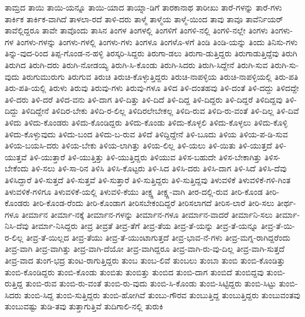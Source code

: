 {ತಾಮ್ರದ
ತಾಯಿ
ತಾಯಿ-ಯನ್ನೂ
ತಾಯಿ-ಯಾದ
ತಾಯ್ನಾ-ಡಿಗೆ
ತಾರಕಾನಾಥ
ತಾರೀಖು
ತಾರೆ-ಗಳನ್ನು
ತಾರೆ-ಗಳು
ತಾರ್ಕಿಕ
ತಾರ್ಕಿಕ-ವಾಗಿದೆ
ತಾಳಲಾ-ರದೆ
ತಾಳಿ-ದರು
ತಾಳ್ಮೆ
ತಾಳ್ಮೆಯ
ತಾಳ್ಮೆ-ಯಿಂದ
ತಾವು
ತಾವೂ
ತಾವೆರ್ನಿಯರ್
ತಾವೆಲ್ಲಿದ್ದರೂ
ತಾವೇ
ತಾವೊಂದು
ತಾಸಿನ
ತಿಂಗಳ
ತಿಂಗಳಲ್ಲಿ
ತಿಂಗಳಿಗೆ
ತಿಂಗಳಿ-ನಲ್ಲಿ
ತಿಂಗಳಿ-ನಲ್ಲೇ
ತಿಂಗಳು
ತಿಂಗಳು-ಗಳ
ತಿಂಗಳು-ಗಳನ್ನು
ತಿಂಗಳು-ಗಳಲ್ಲಿ
ತಿಂಗಳು-ಗಳು
ತಿಂಗಳೂ
ತಿಂಗಳೊ-ಳಗೆ
ತಿಂಡಿ
ತಿಂಡಿ-ಯನ್ನು
ತಿಂದು
ತಿನಿಸು-ಗಳು
ತಿನ್ನು-ವುದ-ರಿಂದ
ತಿಪ್ಪ-ಗೊಂಡ-ನ-ಹಳ್ಳಿ
ತಿರಸ್ಕರಿ-ಸಿದ್ದರು
ತಿರುಗಾ-ಡಲು
ತಿರುಗಾ-ಡುತ್ತಿದ್ದರು
ತಿರುಗಾಡುತ್ತಿದ್ದೆವು
ತಿರುಗಿ
ತಿರುಗಿದ
ತಿರುಗಿ-ದರು
ತಿರುಗಿ-ನೋಡಯ್ಯ
ತಿರುಗಿ-ಸಿ-ಕೊಂಡು
ತಿರುಗಿ-ಸಿದರು
ತಿರುಗಿ-ಸಿದ್ದೇನೆ
ತಿರುಗಿ-ಸುವ
ತಿರುಗಿ-ಸು-ವುದು
ತಿರುಗುಮುರುಗು
ತಿರುಗುವ
ತಿರುಚಿ
ತಿರುಚಿ-ಕೊಳ್ಳುತ್ತಿದ್ದರು
ತಿರುಚಿ-ನಾಪಳ್ಳಿಯ
ತಿರುಚಿ-ನಾಪಳ್ಳಿಯಲ್ಲಿ
ತಿರು-ಪತಿ
ತಿರು-ಪತಿ-ಯಲ್ಲಿ
ತಿರುಳು
ತಿರುವು
ತಿರುವು-ಗಳು
ತಿರುವು-ಗಳೂ
ತಿಳಿದ
ತಿಳಿ-ದಂತಹವು
ತಿಳಿ-ದಂತೆ
ತಿಳಿ-ದದ್ದು
ತಿಳಿದದ್ದೇ
ತಿಳಿ-ದರು
ತಿಳಿ-ದರೆ
ತಿಳಿದ-ವನು
ತಿಳಿ-ದಾಗ
ತಿಳಿ-ದಿತ್ತು
ತಿಳಿ-ದಿದೆ
ತಿಳಿ-ದಿದ್ದ
ತಿಳಿ-ದಿದ್ದರು
ತಿಳಿ-ದಿದ್ದರೆ
ತಿಳಿದಿದ್ದವು
ತಿಳಿ-ದಿದ್ದು
ತಿಳಿದಿದ್ದೇನೆ
ತಿಳಿದಿರ-ಬೇಕು
ತಿಳಿದಿ-ರ-ಲಿಲ್ಲ
ತಿಳಿದಿರಲೇಬೇಕಲ್ಲ
ತಿಳಿದಿ-ರುವ
ತಿಳಿದಿ-ರು-ವಂತೆ
ತಿಳಿ-ದಿಲ್ಲ
ತಿಳಿ-ದಿವೆ
ತಿಳಿದು
ತಿಳಿದು-ಕೊಂಡರು
ತಿಳಿದು-ಕೊಂಡಿದ್ದರು
ತಿಳಿದು-ಕೊಂಡು
ತಿಳಿದು-ಕೊಳ್ಳಲಿ
ತಿಳಿದು-ಕೊಳ್ಳಲು
ತಿಳಿದು-ಕೊಳ್ಳಿ
ತಿಳಿದು-ಕೊಳ್ಳುವುದು
ತಿಳಿದು-ಬಂದ
ತಿಳಿದು-ಬ-ರುವ
ತಿಳಿದೆ
ತಿಳಿದ್ದಿದ್ದೇನೆ
ತಿಳಿ-ಬೂದು
ತಿಳಿಯ
ತಿಳಿಯ-ಪ-ಡಿ-ಸುವ
ತಿಳಿಯ-ಬಯಸಿ-ದರು
ತಿಳಿಯ-ಬೇಕು
ತಿಳಿಯ-ಲಾಗಿತ್ತು
ತಿಳಿಯ-ಲಿಲ್ಲ
ತಿಳಿ-ಯಲು
ತಿಳಿ-ಯಿತು
ತಿಳಿ-ಯುತ್ತದೆ
ತಿಳಿ-ಯುತ್ತವೆ
ತಿಳಿ-ಯುತ್ತಾರೆ
ತಿಳಿ-ಯುತ್ತಿತ್ತು
ತಿಳಿ-ಯುತ್ತಿದ್ದರು
ತಿಳಿಯುವ
ತಿಳಿಸ-ಬಹುದೇ
ತಿಳಿಸ-ಬೇಕಾಗಿತ್ತು
ತಿಳಿಸ-ಬೇಕೆಂದು
ತಿಳಿ-ಸಲು
ತಿಳಿ-ಸಾ-ರಿನ
ತಿಳಿಸಿ
ತಿಳಿಸಿ-ಕೊಟ್ಟರು
ತಿಳಿ-ಸಿದ
ತಿಳಿಸಿ-ದರು
ತಿಳಿಸಿ-ದಾಗ
ತಿಳಿ-ಸಿದೆ
ತಿಳಿಸಿ-ದೆವು
ತಿಳಿಸಿದ್ದಾರೆ
ತಿಳಿ-ಸುತ್ತದೆ
ತಿಳಿ-ಸುತ್ತವೆ
ತಿಳಿ-ಸುತ್ತಾರೆ
ತಿಳಿ-ಸುತ್ತಿದ್ದರು
ತಿಳಿ-ಸುತ್ತಿದ್ದವು
ತಿಳುವಳಿಕೆ
ತಿಳುವಳಿಕೆ-ಗಳಿ-ಗಿಂತ
ತಿಳುವಳಿಕೆ-ಗಳಿಗೂ
ತಿಳುವಳಿಕೆ-ಯಲ್ಲಿ
ತಿಳುವಳಿ-ಕೆಯು
ತೀಕ್ಷ್ಣ
ತೀಕ್ಷ್ಣ-ವಾಗಿ
ತೀರ-ದಲ್ಲಿ-ರುವ
ತೀರಿ-ಕೊಂಡ
ತೀರಿ-ಕೊಂಡರು
ತೀರಿ-ಕೊಂಡ-ರೆಂದು
ತೀರಿ-ಕೊಂಡಾಗ
ತೀರಿಸಬೇಕಂದಿದ್ದರೆ
ತೀರಿಸಲಾಗದೆ
ತೀರಿಸ-ಲಾರೆ
ತೀರಿ-ಸಲು
ತೀರ್ಥ-ಗಳೂ
ತೀರ್ಮಾನ
ತೀರ್ಮಾ-ನಕ್ಕೆ
ತೀರ್ಮಾನ-ಗಳನ್ನು
ತೀರ್ಮಾನ-ಗಳೂ
ತೀರ್ಮಾನ-ವಾದರೆ
ತೀರ್ಮಾನಿ-ಸಲು
ತೀರ್ಮಾ-ನಿಸಿ-ದೆವು
ತೀರ್ಮಾ-ನಿಸಿದ್ದರು
ತೀವ್ರ
ತೀವ್ರತೆ
ತೀವ್ರ-ತೆಗೆ
ತೀವ್ರ-ತೆಯ
ತೀವ್ರ-ತೆ-ಯನ್ನು
ತೀವ್ರ-ತೆ-ಯನ್ನೂ
ತೀವ್ರ-ತೆ-ಯಿ-ರ-ಲಿಲ್ಲ
ತೀವ್ರ-ತೆ-ಯಿಲ್ಲದ
ತೀವ್ರ-ತೆಯು
ತೀವ್ರ-ತೆ-ಯುಂಟಾಗುತ್ತದೆ
ತೀವ್ರ-ಭಾವ-ನೆ-ಗಳು
ತೀವ್ರ-ಮಗ್ನ-ರಾಗಿದ್ದರೆಂದು
ತೀವ್ರ-ವಾಗಿ
ತೀವ್ರ-ವಾಗಿತ್ತು
ತೀವ್ರ-ವಾಗಿ-ದೆಯೋ
ತೀವ್ರ-ವಾಗಿದ್ದರೂ
ತೀವ್ರ-ವಾಗಿ-ರು-ವು-ದಿಲ್ಲ
ತೀವ್ರ-ವಾಗಿ-ಸುತ್ತದೆ
ತೀವ್ರ-ವಾದ
ತುಂಗ-ಭದ್ರ
ತುಂಟ-ರಾಗುತ್ತಿದ್ದರು
ತುಂಬ
ತುಂಬ-ಲಿವೆ
ತುಂಬಲು
ತುಂಬಾ
ತುಂಬಿ
ತುಂಬಿ-ಕೊಂಡಿತ್ತು
ತುಂಬಿ-ಕೊಂಡಿದ್ದರು
ತುಂಬಿ-ಕೊಂಡು
ತುಂಬಿತು
ತುಂಬಿತ್ತು
ತುಂಬಿದ
ತುಂಬಿ-ದಾಗ
ತುಂಬಿದೆ
ತುಂಬಿದ್ದವು
ತುಂಬಿ-ರುತ್ತಿದ್ದ
ತುಂಬಿ-ರುವ
ತುಂಬಿ-ರು-ವಂತೆ
ತುಂಬಿ-ರು-ವುದು
ತುಂಬಿ-ಸಿ-ಕೊಂಡು
ತುಂಬಿ-ಸಿಟ್ಟಿದ್ದರು
ತುಂಬಿ-ಸಿಟ್ಟು
ತುಂಬಿ-ಸಿದರು
ತುಂಬಿ-ಸಿದ್ದ
ತುಂಬಿ-ಸುತ್ತಿದ್ದರು
ತುಂಬಿ-ಹೋಗಿವೆ
ತುಂಬು-ಗೌರವ
ತುಂಬುತ್ತಿದ್ದ
ತುಂಬುತ್ತಿದ್ದರು
ತುಂಬುವಂತವು
ತುಂಬುವಷ್ಟು
ತುಡಿ-ತವು
ತುತ್ತಾಗುತ್ತಿವೆ
ತುದಿಗಾಲಿ-ನಲ್ಲಿ
ತುರುಕಿ
}
